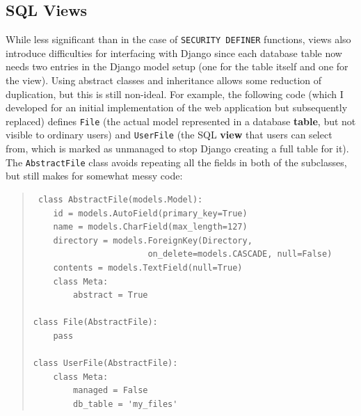 \documentclass[12pt]{report}
\begin{document}
\subsection{SQL Views}
While less significant than in the case of \texttt{SECURITY DEFINER} functions, views also introduce difficulties for interfacing with Django since each database table now needs two entries in the Django model setup (one for the table itself and one for the view). Using abstract classes and inheritance allows some reduction of duplication, but this is still non-ideal. For example, the following code (which I developed for an initial implementation of the web application but subsequently replaced) defines \texttt{File} (the actual model represented in a database \textbf{table}, but not visible to ordinary users) and \texttt{UserFile} (the SQL \textbf{view} that users can select from, which is marked as unmanaged to stop Django creating a full table for it). The \texttt{AbstractFile} class avoids repeating all the fields in both of the subclasses, but still makes for somewhat messy code:

\begin{quote}
\begin{samepage}
\begin{verbatim}
 class AbstractFile(models.Model):
    id = models.AutoField(primary_key=True)
    name = models.CharField(max_length=127)
    directory = models.ForeignKey(Directory,
                       on_delete=models.CASCADE, null=False)
    contents = models.TextField(null=True)
    class Meta:
        abstract = True

class File(AbstractFile):
    pass

class UserFile(AbstractFile):
    class Meta:
        managed = False
        db_table = 'my_files'
\end{verbatim}
\end{samepage}
\end{quote}
\end{document}
